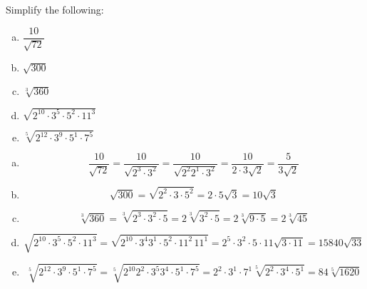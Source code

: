 \documentclass[11pt,letterpaper]{article}
\begin{document}
\newpage



 Simplify the following:
	\begin{enumerate}[(a)]
	\item $\dfrac{10}{\sqrt{72}}$
	\item $\sqrt{300}$
	\item $\sqrt[3]{360}$
	\item $\sqrt{2^{10} \cdot 3^5 \cdot 5^2 \cdot 11^3}$
	\item $\sqrt[5]{2^{12} \cdot 3^9 \cdot 5^1 \cdot 7^5}$
	\end{enumerate} \pspace

\sol 
\begin{enumerate}[(a)]
\item 
	\[
	\dfrac{10}{\sqrt{72}}= \dfrac{10}{\sqrt{2^3 \cdot 3^2}}= \dfrac{10}{\sqrt{2^2 2^1 \cdot 3^2}}= \dfrac{10}{2 \cdot 3 \sqrt{2}}= \dfrac{5}{3 \sqrt{2}}
	\] \pspace

\item 
	\[
	\sqrt{300}= \sqrt{2^2 \cdot 3 \cdot 5^2}= 2 \cdot 5 \sqrt{3}= 10 \sqrt{3}
	\] \pspace
 
\item 
	\[
	\sqrt[3]{360}= \sqrt[3]{2^3 \cdot 3^2 \cdot 5}= 2 \sqrt[3]{3^2 \cdot 5}= 2 \sqrt[3]{9 \cdot 5}= 2 \sqrt[3]{45}
	\] \pspace
 
\item 
	\[
	\sqrt{2^{10} \cdot 3^5 \cdot 5^2 \cdot 11^{3}}= \sqrt{2^{10} \cdot 3^4 3^1 \cdot 5^2 \cdot 11^2\, 11^1}= 2^5 \cdot 3^2 \cdot 5 \cdot 11 \sqrt{3 \cdot 11}= 15840 \sqrt{33}
	\] \pspace
 
\item 
	\[
	\sqrt[5]{2^{12} \cdot 3^9 \cdot 5^1 \cdot 7^5}= \sqrt[5]{2^{10} 2^2 \cdot 3^5 3^4 \cdot 5^1 \cdot 7^5}= 2^2 \cdot 3^1 \cdot 7^1 \sqrt[5]{2^2 \cdot 3^4 \cdot 5^1}= 84 \sqrt[5]{1620}
	\] 
\end{enumerate} 
\end{document}
